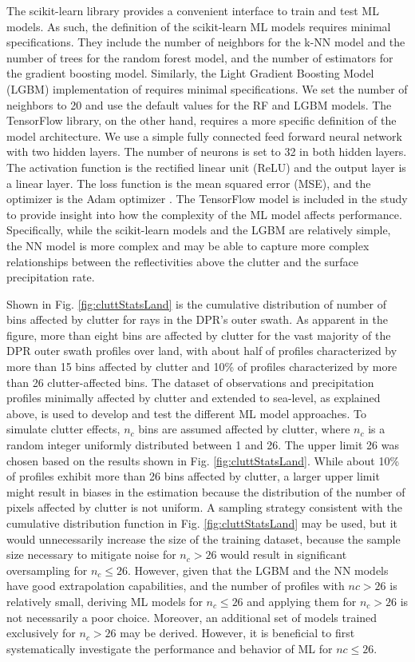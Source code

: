 \documentclass{ametsocV6.1} %
\begin{document}
The scikit-learn library provides a convenient interface to train and test ML models.  As such, the definition of the scikit-learn ML models requires minimal specifications. They include the number of neighbors for the k-NN model and the number of trees for the random forest model, and the number of estimators for the gradient boosting model. Similarly, the Light Gradient Boosting Model (LGBM) implementation of \cite{ke2017} requires minimal specifications.  We set the number of neighbors to 20 and use the default values for the RF and LGBM models. The TensorFlow library, on the other hand, requires a more specific definition of the model architecture.  We use a simple fully connected feed forward neural network with two hidden layers. The number of neurons is set to 32 in both hidden layers.  The activation function is the rectified linear unit (ReLU) \citep{relu2010} and the output layer is a linear layer.  The loss function is the mean squared error (MSE), and the optimizer is the Adam optimizer \citep{adam2014}. The TensorFlow model is included in the study to provide insight into how the complexity of the ML model affects performance.  Specifically, while the scikit-learn models and the LGBM are relatively simple, the NN model is more complex \citep{deepL2016} and may be able to capture more complex relationships between the reflectivities above the clutter and the surface precipitation rate.  


Shown in Fig. \ref{fig:cluttStatsLand} is the cumulative distribution of number of bins affected by clutter for rays in the DPR's outer swath. As apparent in the figure, more than eight bins are affected by clutter for the vast majority of the DPR outer swath profiles over land, with about half of profiles characterized by more than 15 bins affected by clutter and 10\% of profiles characterized by more than 26 clutter-affected bins. The dataset of observations and precipitation profiles minimally affected by clutter and extended to sea-level, as explained above, is used to develop and test the different ML model approaches.  To simulate clutter effects,  $n_c$ bins are assumed affected by clutter, where $n_c$ is a random integer uniformly distributed between 1 and 26. The upper limit 26 was chosen based on the results shown in Fig. \ref{fig:cluttStatsLand}. While about 10\% of profiles exhibit more than 26 bins affected by clutter, a larger upper limit might result in biases in the estimation because the distribution of the number of pixels affected by clutter is not uniform. A sampling strategy consistent with the cumulative distribution function in Fig. \ref{fig:cluttStatsLand} may be used, but it would unnecessarily increase the size of the training dataset, because the sample size necessary to mitigate noise for $n_c>26$ would result in significant oversampling for $n_c\leq 26$. However, given that the LGBM and the NN models have good extrapolation capabilities, and the number of profiles with $nc>26$ is relatively small, deriving ML models for $n_c\leq 26$ and applying them for $n_c>26$ is not necessarily a poor choice. Moreover, an additional set of models trained exclusively for $n_c>26$ may be derived. However, it is beneficial to first systematically investigate the performance and behavior of ML for $nc\leq 26$.
\end{document}
